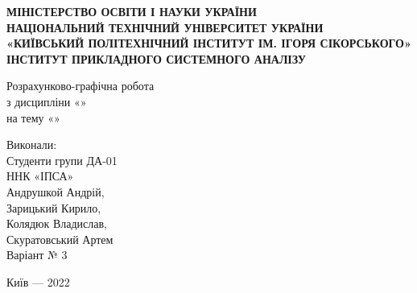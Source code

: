 \begin{titlepage}

	\begin{center}
		
		\textbf{
			МІНІСТЕРСТВО ОСВІТИ І НАУКИ УКРАЇНИ\\
			НАЦІОНАЛЬНИЙ ТЕХНІЧНИЙ УНІВЕРСИТЕТ УКРАЇНИ\\
			«КИЇВСЬКИЙ ПОЛІТЕХНІЧНИЙ ІНСТИТУТ ІМ. ІГОРЯ СІКОРСЬКОГО»\\
			ІНСТИТУТ ПРИКЛАДНОГО СИСТЕМНОГО АНАЛІЗУ\\
		}
		
		\vspace{10cm}

		Розрахунково-графічна робота\\
		з дисципліни «\LabTheme »\\
		на тему «\LabName »
		
		\vspace{3cm}

		\begin{flushright}
			Виконали:\\
			Студенти групи ДА-01\\
			ННК «ІПСА»\\
			Андрушкой Андрій, \\
			Зарицький Кирило, \\
			Колядюк Владислав, \\
			Скуратовський Артем\\
			Варіант № 3
		\end{flushright}
		
	\vfill
	Київ — 2022

	\end{center}

\end{titlepage}